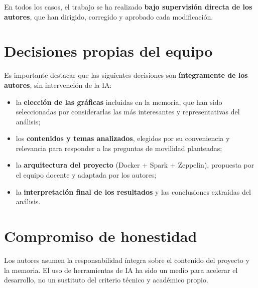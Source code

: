 En todos los casos, el trabajo se ha realizado \textbf{bajo supervisión
directa de los autores}, que han dirigido, corregido y aprobado cada
modificación.

\section{Decisiones propias del equipo}
Es importante destacar que las siguientes decisiones son \textbf{íntegramente
de los autores}, sin intervención de la IA:

\begin{itemize}
    \item la \textbf{elección de las gráficas} incluidas en la memoria, que
    han sido seleccionadas por considerarlas las más interesantes y
    representativas del análisis;
    \item los \textbf{contenidos y temas analizados}, elegidos por su
    conveniencia y relevancia para responder a las preguntas de movilidad
    planteadas;
    \item la \textbf{arquitectura del proyecto} (Docker + Spark + Zeppelin),
    propuesta por el equipo docente y adaptada por los autores;
    \item la \textbf{interpretación final de los resultados} y las conclusiones
    extraídas del análisis.
\end{itemize}

\section{Compromiso de honestidad}
Los autores asumen la responsabilidad íntegra sobre el contenido del proyecto
y la memoria. El uso de herramientas de IA ha sido un medio para acelerar el
desarrollo, no un sustituto del criterio técnico y académico propio.
